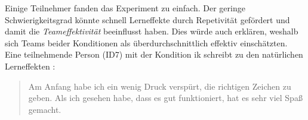 \documentclass[a4paper,11pt]{article}%
\renewcommand{\\}{\vspace*{0.5\baselineskip} \newline}
\begin{document}
{{Einige Teilnehmer fanden das Experiment zu einfach. Der geringe Schwierigkeitsgrad könnte schnell Lerneffekte durch Repetivität gefördert und damit die \textit{Teameffektivität} beeinflusst haben. Dies würde auch erklären, weshalb sich Teams beider Konditionen als überdurchschnittlich effektiv einschätzten.
Eine teilnehmende Person (ID7) mit der Kondition \ac{ik} schreibt zu den natürlichen Lerneffekten :
\begin{quote}
\glqq{}Am Anfang habe ich ein wenig Druck verspürt, die richtigen Zeichen zu geben. Als ich gesehen habe, dass es gut funktioniert, hat es sehr viel Spaß gemacht.\dq{}
\end{quote}
%
%


}}
\end{document}
